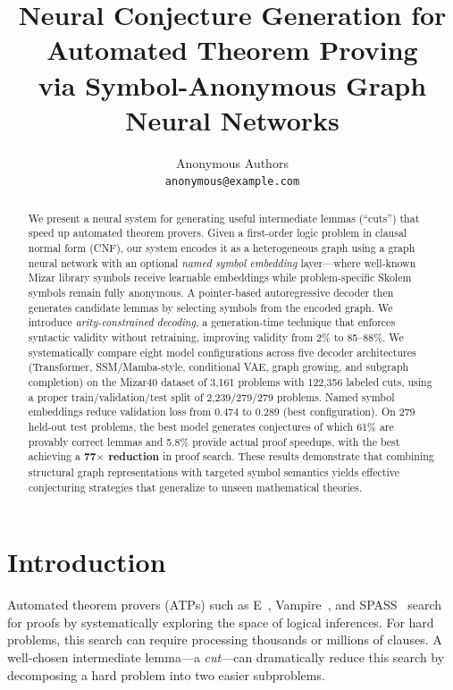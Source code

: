 \documentclass{article}
\title{Neural Conjecture Generation for Automated Theorem Proving\\via Symbol-Anonymous Graph Neural Networks}
\author{%
  Anonymous Authors\\
  \texttt{anonymous@example.com}
}
\begin{document}
\maketitle

\begin{abstract}
We present a neural system for generating useful intermediate lemmas (``cuts'')
that speed up automated theorem provers. Given a first-order logic problem in
clausal normal form (CNF), our system encodes it as a heterogeneous graph using
a graph neural network with an optional \emph{named symbol embedding} layer---where
well-known Mizar library symbols receive learnable embeddings while problem-specific
Skolem symbols remain fully anonymous. A pointer-based autoregressive decoder then
generates candidate lemmas by selecting symbols from the encoded graph. We introduce
\emph{arity-constrained decoding}, a generation-time technique that enforces
syntactic validity without retraining, improving validity from 2\% to 85--88\%.
We systematically compare eight model configurations across five decoder architectures
(Transformer, SSM/Mamba-style, conditional VAE, graph growing, and subgraph completion)
on the Mizar40 dataset of 3,161 problems with 122,356 labeled cuts, using a proper
train/validation/test split of 2,239/279/279 problems. Named symbol embeddings
reduce validation loss from 0.474 to 0.289 (best configuration). On 279 held-out
test problems, the best model generates conjectures of which 61\% are provably
correct lemmas and 5.8\% provide actual proof speedups, with the best achieving a
\textbf{77$\times$ reduction} in proof search. These results demonstrate that
combining structural graph representations with targeted symbol semantics yields
effective conjecturing strategies that generalize to unseen mathematical theories.
\end{abstract}

\section{Introduction}
\label{sec:intro}

Automated theorem provers (ATPs) such as E~\cite{schulz2002ebrainiac},
Vampire~\cite{kovacs2013vampire}, and SPASS~\cite{weidenbach2001spass}
search for proofs by systematically exploring the space of logical inferences.
For hard problems, this search can require processing thousands or millions
of clauses. A well-chosen intermediate lemma---a \emph{cut}---can dramatically
reduce this search by decomposing a hard problem into two easier subproblems.
\end{document}
